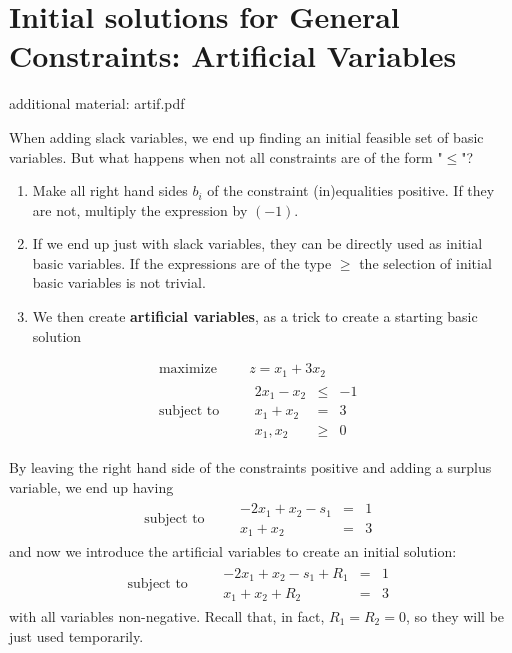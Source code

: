 
\section{Initial solutions for General Constraints: Artificial Variables}

additional material: artif.pdf

  When adding slack variables, we end up finding an initial feasible set of basic variables. But what happens when not all constraints are of the form "$\leq$"?\cite{carter_operations_2019}

  \begin{enumerate}
    \item Make all right hand sides $b_i$ of the constraint (in)equalities positive. If they are not, multiply the expression by $(-1)$.
    \item If we end up just with slack variables, they can be directly used as initial basic variables. If the expressions are of the type $\geq$ the selection of initial basic variables is not trivial.
    \item We then create {\bf artificial variables}, as a trick to create a starting basic solution
  \end{enumerate}
  \begin{equation*}
    \begin{aligned}
      \text{maximize } \quad & z = x_1+3x_2 \\
      \text{subject to }\quad &
      \begin{array}{rcl}
        2x_1 -x_2 &\leq &-1 \\
        x_1+x_2 &= &3 \\
        x_1,x_2 &\geq& 0
      \end{array}
    \end{aligned}
  \end{equation*}

  By leaving the right hand side of the constraints positive and adding a surplus variable, we end up having
  \begin{equation*}
    \begin{aligned}
       \text{subject to }\quad &
      \begin{array}{rcl}
        -2x_1 +x_2 -s_1 &= &1 \\
        x_1+x_2 &= &3
      \end{array}
    \end{aligned}
  \end{equation*}
  and now we introduce the artificial variables to create an initial solution:
  \begin{equation*}
    \begin{aligned}
       \text{subject to }\quad &
      \begin{array}{rcl}
        -2x_1 +x_2 -s_1 +R_1&= &1 \\
        x_1+x_2 +R_2&= &3
      \end{array}
    \end{aligned}
  \end{equation*}
  with all variables non-negative. Recall that, in fact, $R_1=R_2=0$, so they will be just used temporarily.
  \\[10pt]

